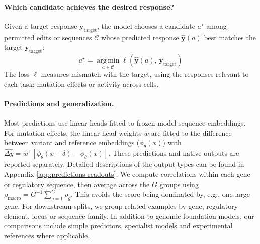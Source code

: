 \paragraph{ Which candidate achieves the desired response?}
Given a target response $\mathbf y_{\mathrm{target}}$, the model chooses a candidate $a^\star$ 
among permitted edits or sequences $\mathcal C$  whose predicted response $\widehat{\mathbf y}(a)$ best matches the target $\mathbf y_{\mathrm{target}}$:
\begin{equation}
    a^\star
    =
    \operatorname*{arg\,min}_{a\in\mathcal C}
    \ell\!\left(
        \widehat{\mathbf y}(a),\,
        \mathbf y_{\mathrm{target}}
    \right)
    \label{eq:control}
\end{equation}
The loss $\ell$ measures mismatch with the target, using the
responses relevant to each task: mutation effects or activity
across cells.

\endgroup

\paragraph{Predictions and generalization.}
Most predictions use linear heads fitted to frozen model sequence embeddings. For mutation effects, the linear head weights $w$ are fitted to the difference between variant and reference embeddings ($\phi_\theta(x)$) with
$\widehat{\Delta y} =w^\top[\phi_\theta(x+\delta)-\phi_\theta(x)]$. These predictions and native outputs are reported separately. Detailed descriptions of the output types can be found in Appendix \ref{app:predictions-readouts}. We compute correlations within each gene or regulatory sequence, then average across the $G$ groups using $\rho_{\mathrm{macro}}=G^{-1}\sum_{g=1}^{G}\rho_g$. This avoids the score being dominated by, e.g., one large gene. For downstream splits, we group related examples by gene, regulatory element, locus or sequence family. In addition to genomic foundation models, our comparisons include simple predictors, specialist models and experimental references where applicable.




